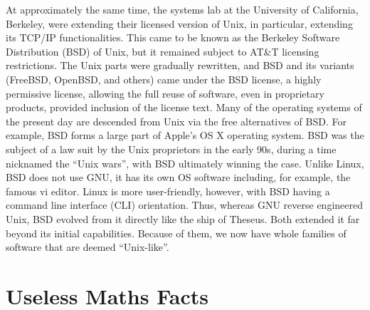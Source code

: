 \documentclass[11pt]{amsart}
\begin{document}
At approximately the same time, the systems lab at the University of California, Berkeley, were extending their licensed version of Unix, in particular, extending its TCP/IP functionalities. This came to be known as the Berkeley Software Distribution (BSD) of Unix, but it remained subject to AT\&T licensing restrictions. The Unix parts were gradually rewritten, and BSD and its variants (FreeBSD, OpenBSD, and others) came under the BSD license, a highly permissive license, allowing the full reuse of software, even in proprietary products, provided inclusion of the license text. Many of the operating systems of the present day are descended from Unix via the free alternatives of BSD. For example, BSD forms a large part of Apple's OS X operating system. BSD was the subject of a law suit by the Unix proprietors in the early 90s, during a time nicknamed the ``Unix wars'', with BSD ultimately winning the case. Unlike Linux, BSD does not use GNU, it has its own OS software including, for example, the famous vi editor. Linux is more user-friendly, however, with BSD having a command line interface (CLI) orientation. Thus, whereas GNU reverse engineered Unix, BSD evolved from it directly like the ship of Theseus. Both extended it far beyond its initial capabilities. Because of them, we now have whole families of software that are deemed ``Unix-like''.

\section{Useless Maths Facts}
\end{document}
